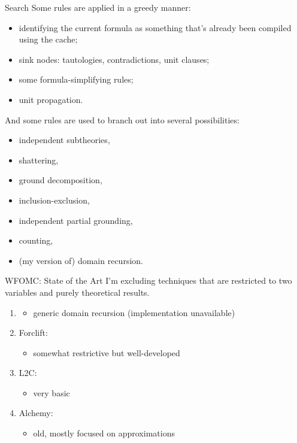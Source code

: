 \documentclass{beamer}
\begin{document}
\begin{frame}{Search}
  Some rules are applied in a greedy manner:
  \begin{itemize}
  \item identifying the current formula as something that's already been compiled using the cache;
  \item sink nodes: tautologies, contradictions, unit clauses;
  \item some formula-simplifying rules;
  \item unit propagation.
  \end{itemize}
  And some rules are used to branch out into several possibilities:
  \begin{itemize}
  \item independent subtheories,
  \item shattering,
  \item ground decomposition,
  \item inclusion-exclusion,
  \item independent partial grounding,
  \item counting,
  \item (my version of) domain recursion.
  \end{itemize}
\end{frame}

\begin{frame}{WFOMC: State of the Art}
  I'm excluding techniques that are restricted to two variables and purely
  theoretical results.
  \begin{enumerate}
  \item \cite{DBLP:conf/nips/KazemiKBP16}
    \begin{itemize}
    \item generic domain recursion (implementation unavailable)
    \end{itemize}
  \item \alert{Forclift}: \cite{DBLP:conf/ijcai/BroeckTMDR11}
    \begin{itemize}
    \item somewhat restrictive but well-developed
    \end{itemize}
  \item \alert{L2C}: \cite{DBLP:conf/kr/KazemiP16}
    \begin{itemize}
    \item very basic
    \end{itemize}
  \item \alert{Alchemy}: \cite{DBLP:conf/aaai/DomingosKPRS06}
    \begin{itemize}
    \item old, mostly focused on approximations
    \end{itemize}
  \end{enumerate}
\end{frame}
\end{document}
